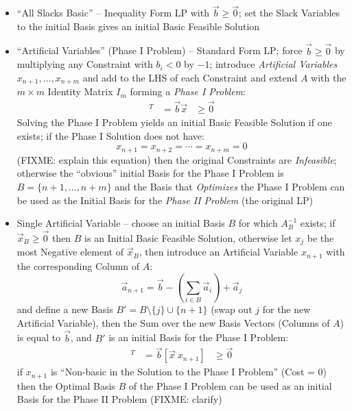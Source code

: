 \begin{itemize}
  \item ``All Slacks Basic'' -- Inequality Form LP with $\vec{b} \geq \vec{0}$;
    set the Slack Variables to the initial Basis gives an initial Basic
    Feasible Solution
  \item ``Artificial Variables'' (Phase I Problem) -- Standard Form LP; force
    $\vec{b} \geq \vec{0}$ by multiplying any Constraint with $b_i < 0$ by
    $-1$; introduce \emph{Artificial Variables} $x_{n+1}, \ldots, x_{n+m}$ and
    add to the LHS of each Constraint and extend $A$ with the $m \times m$
    Identity Matrix $I_m$ forming a \emph{Phase I Problem}:
    \begin{align*}
      [A \ I_m][x_1 \ \cdots \ x_{n+m}]^T & = \vec{b}
                                  \vec{x} & \geq \vec{0}
    \end{align*}
    Solving the Phase I Problem yields an initial Basic Feasible Solution if
    one exists; if the Phase I Solution does not have:
    \[
      x_{n+1} = x_{n+2} = \cdots = x_{n+m} = 0
    \]
    (FIXME: explain this equation)
    then the original Constraints are \emph{Infeasible}; otherwise the
    ``obvious'' initial Basis for the Phase I Problem is $B = \{ n+1, \ldots,
    n+m \}$ and the Basis that \emph{Optimizes} the Phase I Problem can be used
    as the Initial Basis for the \emph{Phase II Problem} (the original LP)
  \item Single Artificial Variable -- choose an initial Basis $B$ for which
    $A_B^{-1}$ exists; if $\vec{x}_B \geq \vec{0}$ then $B$ is an Initial Basic
    Feasible Solution, otherwise let $x_j$ be the most Negative element of
    $\vec{x}_B$, then introduce an Artificial Variable $x_{n+1}$ with the
    corresponding Column of $A$:
    \[
      \vec{a}_{n+1} = \vec{b} - (\sum_{i\in{B}}\vec{a}_i) + \vec{a}_j
    \]
    and define a new Basis $B' = B \setminus \{j\} \cup \{n+1\}$ (swap out $j$
    for the new Artificial Variable), then the Sum over the new Basis Vectors
    (Columns of $A$) is equal to $\vec{b}$, and $B'$ is an initial Basis for
    the Phase I Problem:
    \begin{align*}
      [A \ \vec{a}_{n+1}][x_1 \ \cdots \ x_{n+1}]^T & = \vec{b}
                                [\vec{x} \ x_{n+1}] & \geq \vec{0}
    \end{align*}
    if $x_{n+1}$ is ``Non-basic in the Solution to the Phase I Problem'' (Cost
    = 0) then the Optimal Basis $B$ of the Phase I Problem can be used as an
    initial Basis for the Phase II Problem (FIXME: clarify)
\end{itemize}



